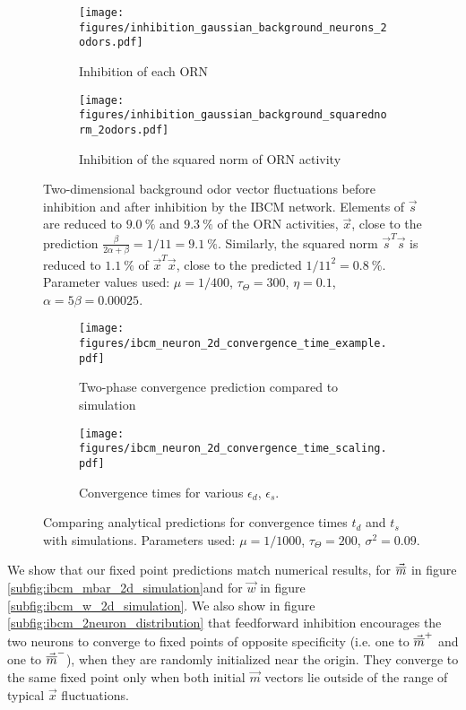 \begin{figure}
	\centering
	\begin{subfigure}[b]{.9\textwidth}
	\texttt{[image: figures/inhibition\_gaussian\_background\_neurons\_2odors.pdf]}
	\caption{Inhibition of each ORN}
	\label{subfig:ibcm_orn_inhibition_2d}
  \end{subfigure} \hfill
  \begin{subfigure}[b]{.9\textwidth}
	\texttt{[image: figures/inhibition\_gaussian\_background\_squarednorm\_2odors.pdf]}
	\caption{Inhibition of the squared norm of ORN activity }
	\label{subfig:ibcm_orn_norm_2d}
  \end{subfigure}
	\caption{Two-dimensional background odor vector fluctuations before inhibition and after inhibition by the IBCM network. Elements of $\vec{s}$ are reduced to $9.0~\%$ and $9.3~\%$ of the ORN activities, $\vec{x}$, close to the prediction $\frac{\beta}{2\alpha + \beta} = 1/11 = 9.1~\%$. Similarly, the squared norm $\vec{s}^T \vec{s}$ is reduced to $1.1~\%$ of $\vec{x}^T \vec{x}$, close to the predicted $1 / 11^2 = 0.8~\%$. Parameter values used: $\mu = 1/400$, $\tau_{\Theta} = 300$, $\eta = 0.1$, $\alpha = 5 \beta = 0.00025$. }
	\label{fig:background_inhibition_2d}
\end{figure}


\begin{figure}[tbp]
	\centering
	\begin{subfigure}[b]{.85\textwidth}
	\texttt{[image: figures/ibcm\_neuron\_2d\_convergence\_time\_example.pdf]}
	\caption{Two-phase convergence prediction compared to simulation}
	\label{subfig:convergence_sample}
  \end{subfigure} \hfill
  \begin{subfigure}[b]{.85\textwidth}
	\texttt{[image: figures/ibcm\_neuron\_2d\_convergence\_time\_scaling.pdf]}
	\caption{Convergence times for various $\epsilon_d$, $\epsilon_s$. }
	\label{subfig:convergence_scaling}
  \end{subfigure}
	\caption{Comparing analytical predictions for convergence times $t_d$ and $t_s$ with simulations. Parameters used: $\mu = 1/1000$, $\tau_{\Theta} = 200$, $\sigma^2 = 0.09$. }
	\label{fig:convergence_time_2d}
\end{figure}


We show that our fixed point predictions match numerical results,  for $\vec{\overline{m}}$ in figure \ref{subfig:ibcm_mbar_2d_simulation}and for $\vec{w}$ in figure \ref{subfig:ibcm_w_2d_simulation}. We also show in figure \ref{subfig:ibcm_2neuron_distribution} that feedforward inhibition encourages the two neurons to converge to fixed points of opposite specificity (i.e. one to $\vec{\overline{m}}^+$ and one to $\vec{\overline{m}}^-$), when they are randomly initialized near the origin. They converge to the same fixed point only when both initial $\vec{m}$ vectors lie outside of the range of typical $\vec{x}$ fluctuations. 

